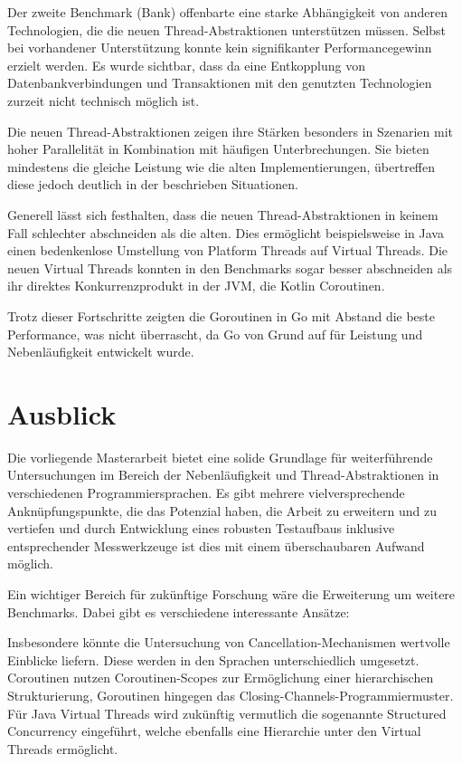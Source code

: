 \documentclass[fontsize=12pt,paper=a4,twoside=semi,parskip=half-,headsepline,headinclude]{scrreprt}
\begin{document}
Der zweite Benchmark (Bank) offenbarte eine starke Abhängigkeit von anderen Technologien, die die neuen Thread-Abstraktionen unterstützen müssen. Selbst bei vorhandener Unterstützung konnte kein signifikanter Performancegewinn erzielt werden. Es wurde sichtbar, dass da eine Entkopplung von Datenbankverbindungen und Transaktionen mit den genutzten Technologien zurzeit nicht technisch möglich ist.

Die neuen Thread-Abstraktionen zeigen ihre Stärken besonders in Szenarien mit hoher Parallelität in Kombination mit häufigen Unterbrechungen. Sie bieten mindestens die gleiche Leistung wie die alten Implementierungen, übertreffen diese jedoch deutlich in der beschrieben Situationen. 

Generell lässt sich festhalten, dass die neuen Thread-Abstraktionen in keinem Fall schlechter abschneiden als die alten. Dies ermöglicht beispielsweise in Java einen bedenkenlose Umstellung von Platform Threads auf Virtual Threads. Die neuen Virtual Threads konnten in den Benchmarks sogar besser abschneiden als ihr direktes Konkurrenzprodukt in der JVM, die Kotlin Coroutinen.

Trotz dieser Fortschritte zeigten die Goroutinen in Go mit Abstand die beste Performance, was nicht überrascht, da Go von Grund auf für Leistung und Nebenläufigkeit entwickelt wurde.


\section{Ausblick}

Die vorliegende Masterarbeit bietet eine solide Grundlage für weiterführende Untersuchungen im Bereich der Nebenläufigkeit und Thread-Abstraktionen in verschiedenen Programmiersprachen. Es gibt mehrere vielversprechende Anknüpfungspunkte, die das Potenzial haben, die Arbeit zu erweitern und zu vertiefen und durch Entwicklung eines robusten Testaufbaus inklusive entsprechender Messwerkzeuge ist dies mit einem überschaubaren Aufwand möglich.

Ein wichtiger Bereich für zukünftige Forschung wäre die Erweiterung um weitere Benchmarks. Dabei gibt es verschiedene interessante Ansätze:

Insbesondere könnte die Untersuchung von Cancellation-Mechanismen wertvolle Einblicke liefern. Diese werden in den Sprachen unterschiedlich umgesetzt. Coroutinen nutzen Coroutinen-Scopes zur Ermöglichung einer hierarchischen Strukturierung, Goroutinen hingegen das Closing-Channels-Programmiermuster.
Für Java Virtual Threads wird zukünftig vermutlich die sogenannte Structured Concurrency eingeführt, welche ebenfalls eine Hierarchie unter den Virtual Threads ermöglicht.
\end{document}
